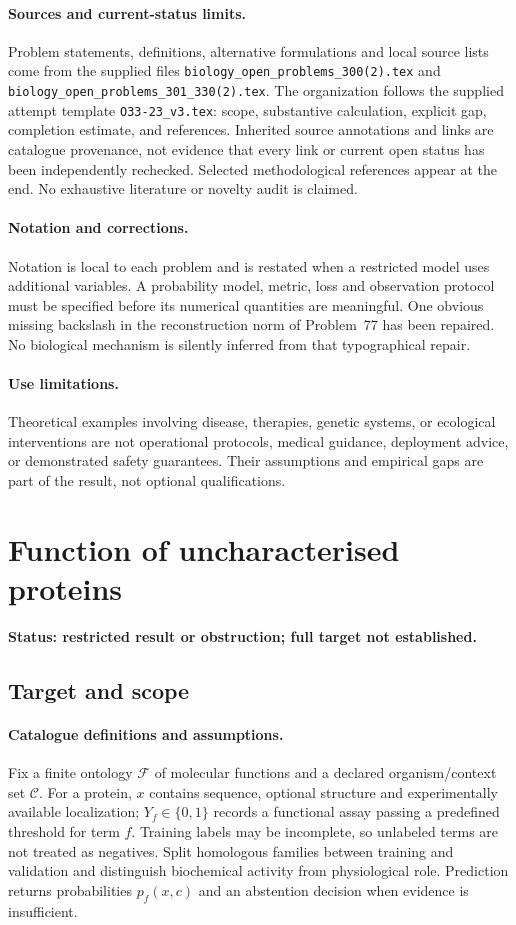 \documentclass[11pt]{article}
\begin{document}
\paragraph{Sources and current-status limits.}
Problem statements, definitions, alternative formulations and local source lists
come from the supplied files
\texttt{biology\_open\_problems\_300(2).tex} and
\texttt{biology\_open\_problems\_301\_330(2).tex}.
The organization follows the supplied attempt template
\texttt{O33-23\_v3.tex}: scope, substantive calculation, explicit gap,
completion estimate, and references. Inherited source annotations and links are
catalogue provenance, not evidence that every link or current open status has
been independently rechecked. Selected methodological references appear at the
end. No exhaustive literature or novelty audit is claimed.

\paragraph{Notation and corrections.}
Notation is local to each problem and is restated when a restricted model uses
additional variables. A probability model, metric, loss and observation protocol
must be specified before its numerical quantities are meaningful. One obvious
missing backslash in the reconstruction norm of Problem~77 has been repaired.
No biological mechanism is silently inferred from that typographical repair.

\paragraph{Use limitations.}
Theoretical examples involving disease, therapies, genetic systems, or ecological
interventions are not operational protocols, medical guidance, deployment advice,
or demonstrated safety guarantees. Their assumptions and empirical gaps are part
of the result, not optional qualifications.


\section*{Function of uncharacterised proteins}
\label{prob:015}
\noindent\textbf{Status: restricted result or obstruction; full target not established.}
\subsection{Target and scope}
\paragraph{Catalogue definitions and assumptions.}
Fix a finite ontology $\mathcal F$ of molecular functions and a declared organism/context set $\mathcal C$. For a protein, $x$ contains sequence, optional structure and experimentally available localization; $Y_f\in\{0,1\}$ records a functional assay passing a predefined threshold for term $f$. Training labels may be incomplete, so unlabeled terms are not treated as negatives. Split homologous families between training and validation and distinguish biochemical activity from physiological role. Prediction returns probabilities $p_f(x,c)$ and an abstention decision when evidence is insufficient.
\end{document}
